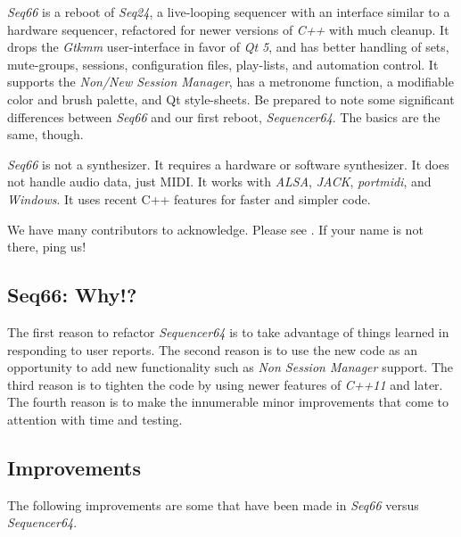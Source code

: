 \documentclass[
 11pt,
 twoside,
 a4paper,
 final                                 %
]{article}
\begin{document}
   \textsl{Seq66} is
   a reboot of \textsl{Seq24},
   a live-looping sequencer with an interface similar to a hardware sequencer,
   refactored for newer versions of
   \textsl{C++} with much cleanup.  It drops the
   \textsl{Gtkmm} user-interface in favor of \textsl{Qt 5},
   and has better handling of sets, mute-groups, sessions, configuration files,
   play-lists, and automation control.
   It supports the \textsl{Non/New Session Manager},
   has a metronome function,
   a modifiable color and brush palette,
   and Qt style-sheets.
   Be prepared to note some significant differences
   between \textsl{Seq66} and our first reboot, \textsl{Sequencer64}.
   The basics are the same, though.

   \textsl{Seq66} is not a synthesizer.
   It requires a hardware or software synthesizer.
   It does not handle audio data, just MIDI.
   It works with \textsl{ALSA}, \textsl{JACK},
   \textsl{portmidi}, and \textsl{Windows}.
   It uses recent C++ features for faster and simpler code.

   We have many contributors to acknowledge.
   Please see .
   If your name is not there, ping us!

\subsection{Seq66: Why!?}
\label{subsec:introduction_vs_others}

   The first reason to refactor \textsl{Sequencer64} is to take advantage of
   things learned in responding to user reports.  The second reason is to use
   the new code as an opportunity to add new functionality such as
   \textsl{Non Session Manager} support.  The third reason is to tighten the
   code by using newer features of \textsl{C++11} and later.
   The fourth reason is to make the innumerable minor improvements that come to
   attention with time and testing.

\subsection{Improvements}
\label{subsec:improvements}

   The following improvements are some that have been made in
   \textsl{Seq66} versus \textsl{Sequencer64}.
\end{document}
